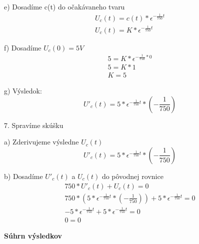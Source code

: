 \documentclass[a4paper,12pt]{article}
\begin{document}
e) Dosadíme c(t) do očakávaneho tvaru
 \begin {equation*}
    \begin{split}
	U_c(t) = c(t) * \epsilon^{-\frac{1}{750}t} \\
	U_c(t) = K * \epsilon^{-\frac{1}{750}t}
    \end{split}
\end{equation*}

f) Dosadíme $U_c(0) = 5 V$
  \begin {equation*}
    \begin{split}
	5 = K * \epsilon^{-\frac{1}{750}*0} \\
	5 = K * 1 \\
	K = 5
    \end{split}
\end{equation*}

g) Výsledok:
\begin{equation*}
	U'_c(t) = 5 * \epsilon^{-\frac{1}{750}t}*(-\frac{1}{750})
\end{equation*}

7. Spravíme skúšku

a) Zderivujeme výsledne $U_c(t)$
\begin{equation*}
	U'_c(t) = 5* \epsilon^{-\frac{1}{750}t} *(-\frac{1}{750})
\end{equation*}

b) Dosadíme $U'_c(t)$ a $U_c(t)$ do pôvodnej rovnice
\begin{equation*}
    \begin{split}
	750 * U'_c(t) + U_c(t) = 0 \\
	750 * (5* \epsilon^{-\frac{1}{750}t} *(-\frac{1}{750})) + 5*\epsilon^{-\frac{1}{750}t} = 0 \\
	-5 * \epsilon^{-\frac{1}{750}t} + 5 * \epsilon^{-\frac{1}{750}t} = 0 \\
	0 = 0
    \end{split}
\end{equation*} 
\newpage
\begin{center}
\textbf{Súhrn výsledkov}
\end{center}
\bigskip
\end{document}
